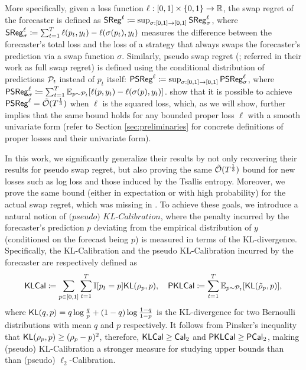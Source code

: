 More specifically, given a loss function $\ell: [0,1]\times\{0,1\} \rightarrow {\mathbb{R}}$, 
the swap regret of the forecaster is defined as 
$\mathsf{SReg}^{\ell} \coloneqq \sup_{\sigma: [0, 1] \to [0, 1]} \mathsf{SReg}^{\ell}_{\sigma}$,
where $\mathsf{SReg}^{\ell}_\sigma \coloneqq \sum_{t = 1} ^ {T} \ell(p_{t}, y_{t}) - \ell(\sigma(p_{t}), y_{t})$
measures the difference between the forecaster's total loss and the loss of a strategy that always swaps the forecaster's prediction via a swap function $\sigma$.
Similarly, pseudo swap regret (\citealp{fishelsonfull}; referred in their work as full swap regret) is defined using the conditional distribution of predictions $\mathcal{P}_{t}$ instead of $p_t$ itself: $\mathsf{PSReg}^{\ell} \coloneqq \sup_{\sigma: [0, 1] \to [0, 1]} \mathsf{PSReg}^{\ell}_{\sigma}$, where $\mathsf{PSReg}_{\sigma}^{\ell} \coloneqq \sum_{t = 1} ^ {T} \mathbb{E}_{p \sim \mathcal{P}_{t}}[\ell(p, y_{t}) - \ell(\sigma(p), y_{t})]$.
\citet{fishelsonfull} show that it is possible to achieve $\mathsf{PSReg}^{\ell} = \tilde{\mathcal{O}}(T^{\frac{1}{3}})$ when $\ell$ is the squared loss, which, as we will show, further implies that the same bound holds for any bounded proper loss $\ell$ with a smooth univariate form (refer to  Section \ref{sec:preliminaries} for concrete definitions of proper losses and their univariate form). 

In this work, we significantly generalize their results by not only recovering their results for pseudo swap regret, but also proving the same $\tilde{\mathcal{O}}(T^{\frac{1}{3}})$ bound for new losses such as log loss and those induced by the Tsallis entropy.
Moreover, we prove the same bound (either in expectation or with high probability) for the actual swap regret, which was missing in \cite{fishelsonfull}.
To achieve these goals, we introduce a natural notion of $\textit{(pseudo) KL-Calibration}$, where the penalty incurred by the forecaster's prediction $p$ deviating from the empirical distribution of $y$ (conditioned on the forecast being $p$) is measured in terms of the KL-divergence. Specifically, the KL-Calibration and the pseudo KL-Calibration incurred by the forecaster are respectively defined as \begin{align}\label{eq:KLCal_PKLCal_def}
    \mathsf{KLCal} \coloneqq \sum_{p \in [0, 1]} \sum_{t = 1} ^ {T} \mathbb{I}{\left[p_{t} = p\right]} \mathsf{KL}(\rho_{p}, p), \quad \mathsf{PKLCal} \coloneqq \sum_{t = 1} ^ {T} \mathbb{E}_{p \sim \mathcal{P}_{t}}[\mathsf{KL}(\tilde{\rho}_{p}, p)],
\end{align}
where $\mathsf{KL}(q, p) = q\log\frac{q}{p}+(1-q)\log\frac{1-q}{1-p}$ is the KL-divergence for two Bernoulli distributions with mean $q$ and $p$ respectively.  
It follows from Pinsker's inequality that $\mathsf{KL}(\rho_{p}, p) \ge 
(\rho_{p} - p) ^ {2}$, therefore, $\mathsf{KLCal} \ge \mathsf{Cal}_{2}$ and $\mathsf{PKLCal} \ge \mathsf{PCal}_{2}$, making (pseudo) KL-Calibration a stronger measure for studying upper bounds than than (pseudo) $\ell_2$-Calibration. 

